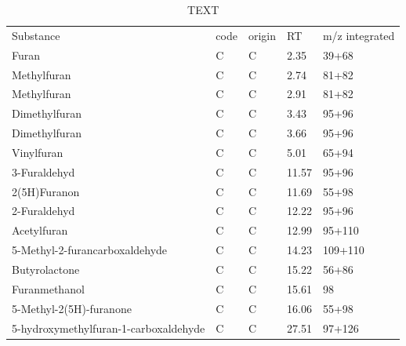 \documentclass[journal abbreviation]{copernicus}
\begin{document}
\begin{table}[t]
\caption{TEXT}
\vskip4mm
\centering
\begin{tabular}{lllll}
\tophline
Substance&code&origin&RT&m/z integrated\\
\middlehline
Furan&C&C&2.35&39+68\\ 
Methylfuran&C&C&2.74&81+82\\ 
Methylfuran&C&C&2.91&81+82\\ 
Dimethylfuran&C&C&3.43&95+96\\ 
Dimethylfuran&C&C&3.66&95+96\\ 
Vinylfuran&C&C&5.01&65+94\\ 
3-Furaldehyd&C&C&11.57&95+96\\ 
2(5H)Furanon&C&C&11.69&55+98\\ 
2-Furaldehyd&C&C&12.22&95+96\\ 
Acetylfuran&C&C&12.99&95+110\\ 
5-Methyl-2-furancarboxaldehyde&C&C&14.23&109+110\\ 
Butyrolactone&C&C&15.22&56+86\\ 
Furanmethanol&C&C&15.61&98\\ 
5-Methyl-2(5H)-furanone&C&C&16.06&55+98\\ 
5-hydroxymethylfuran-1-carboxaldehyde&C&C&27.51&97+126\\ 


\end{tabular}
\end{table}
\end{document}
